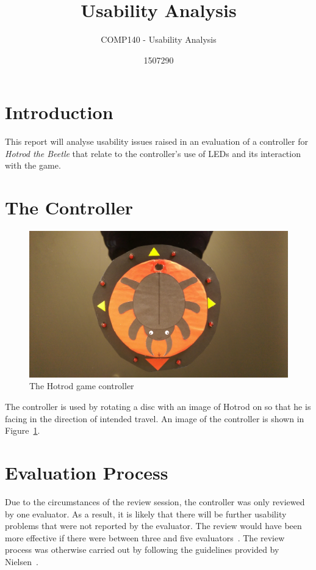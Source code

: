 \documentclass{scrartcl}
\title{Usability Analysis}
\subtitle{COMP140 - Usability Analysis}
\author{1507290}
\begin{document}
\maketitle

\abstract{}
\section{Introduction}
This report will analyse usability issues raised in an evaluation of a controller for \textit{Hotrod the Beetle} that relate to the controller's use of LEDs and its interaction with the game.

\section{The Controller}
\begin{figure}[h]
\includegraphics[width=\textwidth]{controller.jpg}
\caption{The Hotrod game controller}
\label{fig:controller}
\end{figure} 
The controller is used by rotating a disc with an image of Hotrod on so that he is facing in the direction of intended travel. An image of the controller is shown in Figure~\ref{fig:controller}.


\section{Evaluation Process}
Due to the circumstances of the review session, the controller was only reviewed by one evaluator. As a result, it is likely that there will be further usability problems that were not reported by the evaluator. The review would have been more effective if there were between three and five evaluators~\cite{nielsen:evaluation}. The review process was otherwise carried out by following the guidelines provided by Nielsen~\cite{nielsen:how}.
\end{document}
